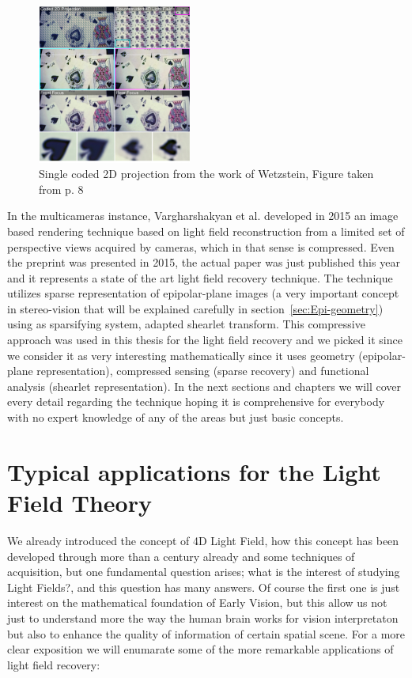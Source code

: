 \bigskip 

\begin{figure}[h!]
\centering
\includegraphics[width= 0.45\textwidth]{./Diagrams/coded-mask.jpg}
\caption{Single coded 2D projection from the work of Wetzstein, Figure taken from \cite{CompressedMIT} p. 8}
\end{figure}


In the multicameras instance, Vargharshakyan et al. \cite{LF-Shearlets} developed in 2015 an image based rendering technique based on light field reconstruction from a limited set of perspective views acquired by cameras, which in that sense is compressed. Even the preprint was presented in 2015, the actual paper was just published this year and it represents a state of the art light field recovery technique. The technique utilizes sparse representation of epipolar-plane images (a very important concept in stereo-vision that will be explained carefully in section~\ref{sec:Epi-geometry}) using as sparsifying system, adapted shearlet transform. This compressive approach was used in this thesis for the light field recovery and we picked it since we consider it as very interesting mathematically since it uses geometry (epipolar-plane representation), compressed sensing (sparse recovery) and functional analysis (shearlet representation). In the next sections and chapters we will cover every detail regarding the technique hoping it is comprehensive for everybody with no expert knowledge of any of the areas but just basic concepts. 


\section{Typical applications for the Light Field Theory}
\label{sec:LF-applications}

We already introduced the concept of 4D Light Field, how this concept has been developed through more than a century already and some techniques of acquisition, but one fundamental question arises; what is the interest of studying Light Fields?, and this question has many answers. Of course the first one is just interest on the mathematical foundation of Early Vision, but this allow us not just to understand more the way the human brain works for vision interpretaton but also to enhance the quality of information of certain spatial scene. For a more clear exposition we will enumarate some of the more remarkable applications of light field recovery:

